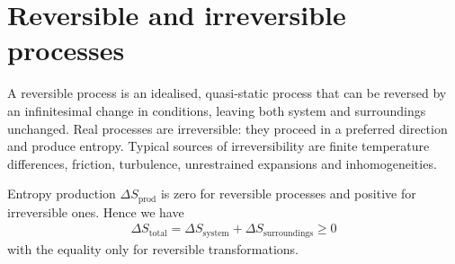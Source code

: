 \section{Reversible and irreversible processes}

	A reversible process is an idealised, quasi-static process that can be reversed by an infinitesimal change in conditions, leaving both system and surroundings unchanged. Real processes are irreversible: they proceed in a preferred direction and produce entropy. Typical sources of irreversibility are finite temperature differences, friction, turbulence, unrestrained expansions and inhomogeneities.
	
	Entropy production $\Delta S_\text{prod}$ is zero for reversible processes and positive for irreversible ones. Hence we have
	\begin{align*}
		\Delta S_\text{total}=\Delta S_\text{system}+\Delta S_\text{surroundings}\geqslant 0
	\end{align*}
	with the equality only for reversible transformations.